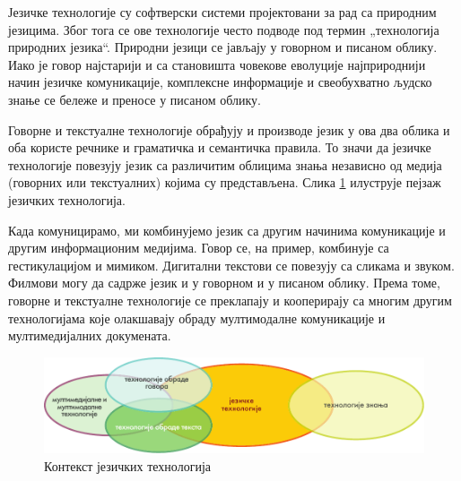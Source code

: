 \begin{multicols}{2}   


Језичке технологије су софтверски системи пројектовани за рад са природним језицима. Због тога се ове технологије често подводе под термин „технологија природних језика“. Природни језици се јављају у говорном и писаном облику. Иако је говор најстарији и са становишта човекове еволуције најприроднији начин језичке комуникације, комплексне информације и свеобухватно људско знање се бележе и преносе у писаном облику. 

Говорне и текстуалне технологије обрађују и производе језик у ова два облика и оба користе речнике и граматичка и семантичка правила. То значи да језичке технологије повезују језик са различитим облицима знања независно од медија (говорних или текстуалних) којима су представљена. Слика \ref{fig:ltincontext_sr} илуструје пејзаж језичких технологија. 

Када комуницирамо, ми комбинујемо језик са другим начинима комуникације и другим информационим медијима. Говор се, на пример, комбинује са гестикулацијом и мимиком. Дигитални текстови се повезују са сликама и звуком. Филмови могу да садрже језик и у говорном и у писаном облику. Према томе, говорне и текстуалне технологије се преклапају и кооперирају са многим другим технологијама које олакшавају обраду мултимодалне комуникације и мултимедијалних докумената. 

\begin{figure}[htb]
  \center
  \includegraphics[width=\textwidth]{../_media/serbian/language_technologies}
  \caption{Контекст језичких технологија}
  \label{fig:ltincontext_sr}
\end{figure}


\end{multicols}
